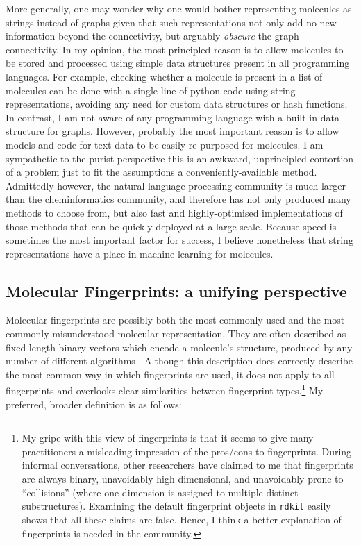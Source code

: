 More generally, one may wonder why one would bother representing molecules as strings instead of graphs
given that such representations not only add no new information beyond the connectivity,
but arguably \emph{obscure} the graph connectivity.
In my opinion, the most principled reason is to allow molecules to be stored and processed
using simple data structures present in all programming languages.
For example, checking whether a molecule is present in a list of molecules can be done with a single line of python code
using string representations, avoiding any need for custom data structures or hash functions.
In contrast, I am not aware of any programming language with a built-in data structure for graphs.
However, probably the most important reason is to allow models and code for text data to be easily re-purposed for molecules.
I am sympathetic to the purist perspective this is an awkward, unprincipled contortion of a problem
just to fit the assumptions a conveniently-available method.
Admittedly however, the natural language processing community is much larger than the cheminformatics community,
and therefore has not only produced many methods to choose from,
but also fast and highly-optimised implementations of those methods that can be quickly deployed at a large scale.
Because speed is sometimes the most important factor for success,
I believe nonetheless that string representations have a place in machine learning for molecules.

\subsection{Molecular Fingerprints: a unifying perspective}
\label{sec:background:fingerprints}

Molecular fingerprints are possibly both the most commonly used
and the most commonly misunderstood molecular representation.
They are often described as fixed-length binary vectors
which encode a molecule's structure, produced by any number of different algorithms
\citep{yang2022concepts-fingerprint}.
Although this description does correctly describe the most common way in which fingerprints are used,
it does not apply to all fingerprints and overlooks clear similarities between fingerprint types.\footnote{
    My gripe with this view of fingerprints is that it seems to give many practitioners a misleading impression
    of the pros/cons to fingerprints.
    During informal conversations, other researchers have claimed to me that
    fingerprints are always binary, unavoidably high-dimensional,
    and unavoidably prone to ``collisions'' (where one dimension is assigned to multiple distinct substructures).
    Examining the default fingerprint objects in \texttt{rdkit} easily shows that all these claims are false.
    Hence, I think a better explanation of fingerprints is needed in the community.
}
My preferred, broader definition is as follows:

